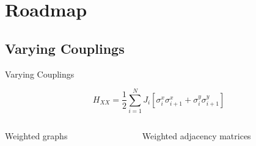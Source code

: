 \documentclass{beamer}
\begin{document}
\section{Roadmap}
\subsection{Varying Couplings}
\begin{frame}[t]{Varying Couplings}
	\begin{exampleblock}{}
	\setlength\abovedisplayskip{-8pt}
	\begin{center}
		\[H_{XX}=\frac{1}{2}\sum_{i=1}^{N}{J_i\left[\sigma_i^x\sigma_{i+1}^x + \sigma_i^y\sigma_{i+1}^y\right]}\]
	\end{center}
	\end{exampleblock}
	\begin{columns}[T]
		\begin{column}{0.5\textwidth}
			\centering
			Weighted graphs
		\end{column}
		\begin{column}{0.5\textwidth}
			\centering
			Weighted adjacency matrices
		\end{column}
	\end{columns}
	
\end{frame}
\end{document}
